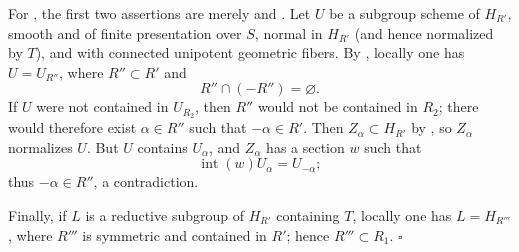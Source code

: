 For \textup{}, the first two assertions are merely  and
. Let \(U\) be a subgroup scheme of \(H_{R'}\), smooth and of
finite presentation over \(S\), normal in \(H_{R'}\) \textup{(and
hence normalized by \(T\))}, and with connected unipotent geometric
fibers. By , locally one has \(U=U_{R''}\), where
\(R''\subset R'\) and
\[
  R''\cap(-R'')=\varnothing.
\]
If \(U\) were not contained in \(U_{R_2}\), then \(R''\) would not
be contained in \(R_2\); there would therefore exist
\(\alpha\in R''\) such that \(-\alpha\in R'\). Then
\(Z_\alpha\subset H_{R'}\) by , so \(Z_\alpha\) normalizes
\(U\). But \(U\) contains \(U_\alpha\), and \(Z_\alpha\) has a
section \(w\) such that
\[
  \operatorname{int}(w)U_\alpha=U_{-\alpha};
\]
thus \(-\alpha\in R''\), a contradiction.

Finally, if \(L\) is a reductive subgroup of \(H_{R'}\) containing
\(T\), locally one has \(L=H_{R'''}\), where \(R'''\) is symmetric
and contained in \(R'\); hence \(R'''\subset R_1\).
\hfill\(\square\)

